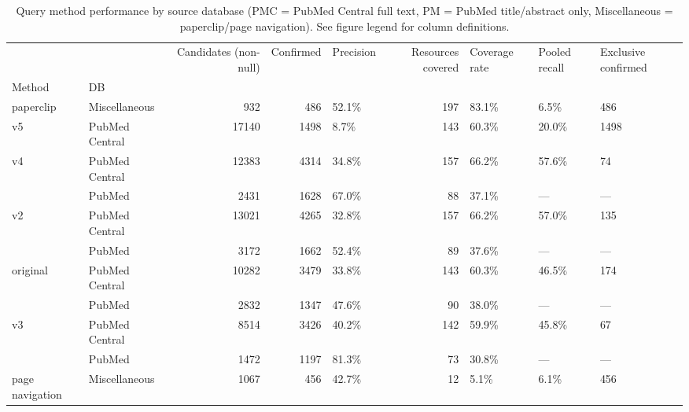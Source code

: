 \begin{table}[htbp]
\caption{Query method performance by source database (PMC = PubMed Central full text, PM = PubMed title/abstract only, Miscellaneous = paperclip/page navigation). See figure legend for column definitions.}
\label{tab:query_method_performance}
\begin{tabular}{llrrlrlll}
\toprule
 &  & Candidates (non-null) & Confirmed & Precision & Resources covered & Coverage rate & Pooled recall & Exclusive confirmed \\
Method & DB &  &  &  &  &  &  &  \\
\midrule
paperclip & Miscellaneous & 932 & 486 & 52.1\% & 197 & 83.1\% & 6.5\% & 486 \\
\cline{1-9}
v5 & PubMed Central & 17140 & 1498 & 8.7\% & 143 & 60.3\% & 20.0\% & 1498 \\
\cline{1-9}
\multirow[t]{2}{*}{v4} & PubMed Central & 12383 & 4314 & 34.8\% & 157 & 66.2\% & 57.6\% & 74 \\
 & PubMed & 2431 & 1628 & 67.0\% & 88 & 37.1\% & — & — \\
\cline{1-9}
\multirow[t]{2}{*}{v2} & PubMed Central & 13021 & 4265 & 32.8\% & 157 & 66.2\% & 57.0\% & 135 \\
 & PubMed & 3172 & 1662 & 52.4\% & 89 & 37.6\% & — & — \\
\cline{1-9}
\multirow[t]{2}{*}{original} & PubMed Central & 10282 & 3479 & 33.8\% & 143 & 60.3\% & 46.5\% & 174 \\
 & PubMed & 2832 & 1347 & 47.6\% & 90 & 38.0\% & — & — \\
\cline{1-9}
\multirow[t]{2}{*}{v3} & PubMed Central & 8514 & 3426 & 40.2\% & 142 & 59.9\% & 45.8\% & 67 \\
 & PubMed & 1472 & 1197 & 81.3\% & 73 & 30.8\% & — & — \\
\cline{1-9}
page navigation & Miscellaneous & 1067 & 456 & 42.7\% & 12 & 5.1\% & 6.1\% & 456 \\
\cline{1-9}
\bottomrule
\end{tabular}
\end{table}
